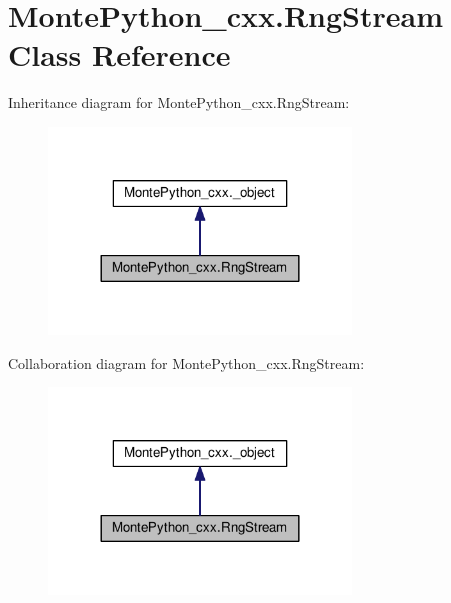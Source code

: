 \hypertarget{classMontePython__cxx_1_1RngStream}{}\section{Monte\+Python\+\_\+cxx.\+Rng\+Stream Class Reference}
\label{classMontePython__cxx_1_1RngStream}


Inheritance diagram for Monte\+Python\+\_\+cxx.\+Rng\+Stream\+:
\nopagebreak
\begin{figure}[H]
\begin{center}
\leavevmode
\includegraphics[width=228pt]{classMontePython__cxx_1_1RngStream__inherit__graph}
\end{center}
\end{figure}


Collaboration diagram for Monte\+Python\+\_\+cxx.\+Rng\+Stream\+:
\nopagebreak
\begin{figure}[H]
\begin{center}
\leavevmode
\includegraphics[width=228pt]{classMontePython__cxx_1_1RngStream__coll__graph}
\end{center}
\end{figure}
